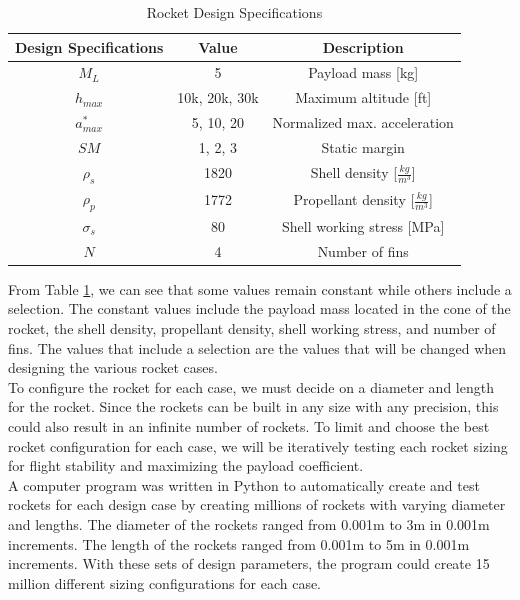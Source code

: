 \documentclass{report}
\begin{document}
\begin{table}[h]
    \centering
    \caption{Rocket Design Specifications}
    \begin{tabular}{|c|c|c|}
        \hline
        \textbf{Design Specifications} & \textbf{Value} & \textbf{Description}\\
        \hline
        $M_L$  & 5 & Payload mass [kg] \\[5pt]
        $h_{max}$ & 10k, 20k, 30k & Maximum altitude [ft] \\[5pt]
        $a^*_{max}$ & 5, 10, 20 & Normalized max. acceleration \\[5pt]
        $SM$ & 1, 2, 3 & Static margin \\[5pt]
        $\rho_s$ & 1820 & Shell density [$\frac{kg}{m^3}$] \\[5pt]
        $\rho_p$ & 1772 & Propellant density [$\frac{kg}{m^3}$] \\[5pt]
        $\sigma_s$ & 80 & Shell working stress [MPa] \\[5pt]
        $N$ & 4 & Number of fins \\[5pt]
        \hline
    \end{tabular}
    \label{table:designspec}
\end{table}

\noindent From Table \ref{table:designspec}, we can see that some values remain constant while others include a selection.
The constant values include the payload mass located in the cone of the rocket, the shell density, propellant density, shell working stress, and number of fins.
The values that include a selection are the values that will be changed when designing the various rocket cases.\\

\noindent To configure the rocket for each case, we must decide on a diameter and length for the rocket.
Since the rockets can be built in any size with any precision, this could also result in an infinite number of rockets.
To limit and choose the best rocket configuration for each case, we will be iteratively testing each rocket sizing for flight stability and maximizing the payload coefficient. \\

\noindent A computer program was written in Python to automatically create and test rockets for each design case by creating millions of rockets with varying diameter and lengths. 
The diameter of the rockets ranged from 0.001m to 3m in 0.001m increments. 
The length of the rockets ranged from 0.001m to 5m in 0.001m increments.
With these sets of design parameters, the program could create 15 million different sizing configurations for each case. \\
\end{document}
